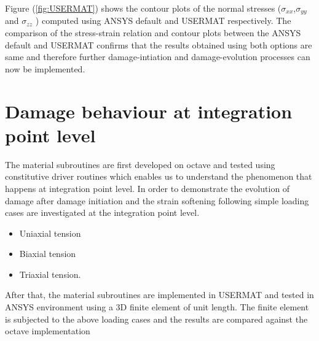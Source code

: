 \documentclass[a4paper,12pt,twoside]{report}
\begin{document}
Figure (\ref{fig:USERMAT}) shows the contour plots of the normal stresses ($\sigma_{xx}$,$\sigma_{yy}$ and $\sigma_{zz}$ ) computed using ANSYS default and USERMAT respectively. The comparison of the stress-strain relation and contour plots between the ANSYS default and USERMAT confirms that the results obtained using both options are same and therefore further damage-intiation and damage-evolution processes can now be implemented.
\section{Damage behaviour at integration point level}
\indent\indent\indent The material subroutines are first developed on octave and tested using constitutive driver routines which enables us to understand the phenomenon that happens at integration point level. In order to demonstrate the evolution of damage after damage initiation and the strain softening following simple loading cases are investigated at the integration point level.
\begin{itemize}
\item Uniaxial tension
\item Biaxial tension
\item Triaxial tension.
\end{itemize} 
After that, the material subroutines are implemented in USERMAT and tested in ANSYS environment using a 3D finite element of unit length. The finite element is subjected to the above loading cases and the results are compared against the octave implementation
\FloatBarrier
\end{document}
